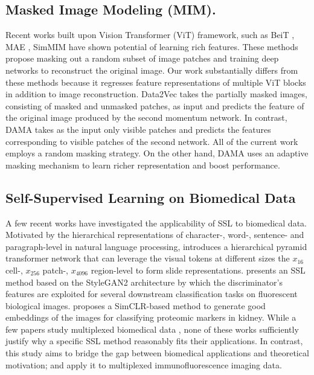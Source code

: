 \documentclass[10pt,twocolumn,letterpaper]{article}
\begin{document}
\subsection{Masked Image Modeling (MIM).} Recent works built upon Vision Transformer (ViT) \cite{vit} framework, such as BeiT \cite{beit}, MAE \cite{mae}, SimMIM \cite{simmim} have shown potential of learning rich features. These methods propose masking out a random subset of image patches and training deep networks to reconstruct the original image. Our work substantially differs from these methods because it regresses feature representations of multiple ViT blocks in addition to image reconstruction. Data2Vec \cite{data2vec} takes the partially masked images, consisting of masked and unmasked patches, as input and predicts the feature of the original image produced by the second momentum network. In contrast, DAMA takes as the input only visible patches and predicts the features corresponding to visible patches of the second network. All of the current work employs a random masking strategy. On the other hand, DAMA uses an adaptive masking mechanism to learn richer representation and boost performance.

\subsection{Self-Supervised Learning on Biomedical Data} \label{subsec:biomedical}
A few recent works have investigated the applicability of SSL to biomedical data. Motivated by the hierarchical representations of character-, word-, sentence- and paragraph-level in natural language processing, \cite{cell6} introduces a hierarchical pyramid transformer network that can leverage the visual tokens at different sizes the $x_{16}$ cell-, $x_{256}$ patch-, $x_{4096}$ region-level to form slide representations. \cite{cell4} presents an SSL method based on the StyleGAN2 architecture by which the discriminator’s features are exploited for several downstream classification tasks on fluorescent biological images. \cite{cell5} proposes a SimCLR-based method to generate good embeddings of the images for classifying proteomic markers in kidney. While a few papers study multiplexed biomedical data \cite{cell4,cell5}, none of these works sufficiently justify why a specific SSL method reasonably fits their applications. In contrast, this study aims to bridge the gap between biomedical applications and theoretical motivation; and apply it to multiplexed immunofluorescence imaging data.
\end{document}
